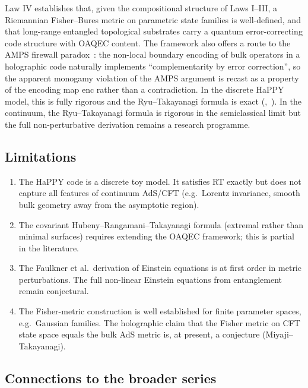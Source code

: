 \documentclass[12pt]{article}
\theoremstyle{definition}
\theoremstyle{remark}
\newcommand{\enc}{\mathrm{enc}}
\begin{document}
Law IV establishes that, given the compositional structure of Laws I--III, a Riemannian Fisher--Bures metric on parametric state families is well-defined, and that long-range entangled topological substrates carry a quantum error-correcting code structure with OAQEC content. The framework also offers a route to the AMPS firewall paradox~\cite{amps2012}: the non-local boundary encoding of bulk operators in a holographic code naturally implements ``complementarity by error correction'', so the apparent monogamy violation of the AMPS argument is recast as a property of the encoding map $\enc$ rather than a contradiction. In the discrete HaPPY model, this is fully rigorous and the Ryu--Takayanagi formula is exact (,~). In the continuum, the Ryu--Takayanagi formula is rigorous in the semiclassical limit \cite{ryutakayanagi2006,fghmv2014} but the full non-perturbative derivation remains a research programme.

\subsection{Limitations}

\begin{enumerate}
  \item The HaPPY code is a discrete toy model. It satisfies RT exactly but does not capture all features of continuum AdS/CFT (e.g.\ Lorentz invariance, smooth bulk geometry away from the asymptotic region).
  \item The covariant Hubeny--Rangamani--Takayanagi formula (extremal rather than minimal surfaces) requires extending the OAQEC framework; this is partial in the literature.
  \item The Faulkner et al.\ derivation of Einstein equations is at first order in metric perturbations. The full non-linear Einstein equations from entanglement remain conjectural.
  \item The Fisher-metric construction is well established for finite parameter spaces, e.g.\ Gaussian families. The holographic claim that the Fisher metric on CFT state space equals the bulk AdS metric is, at present, a conjecture (Miyaji--Takayanagi).
\end{enumerate}

\subsection{Connections to the broader series}
\end{document}
